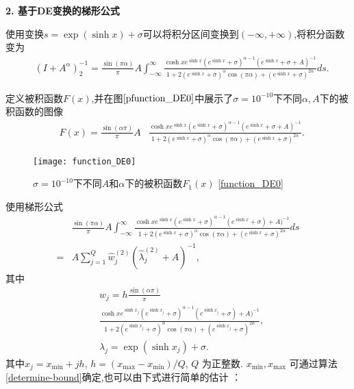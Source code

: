 \textbf{2. 基于DE变换的梯形公式}


使用变换\(s=\exp(\sinh x)+\sigma\)可以将积分区间变换到\((-\infty,+\infty)\),将积分函数变为
\begin{equation}
	\begin{aligned}
		&(I+A^{\alpha})^{-1}_2=
		\frac{\sin(\pi\alpha)}{\pi}A\int_{-\infty}^{\infty}
		\frac{ \cosh xe^{\sinh x}(e^{\sinh x}+\sigma)^{\alpha-1}(e^{\sinh x}+\sigma+{A})^{-1}}{1+2(e^{\sinh x}+\sigma)^{\alpha}\cos(\pi\alpha)+(e^{\sinh x}+\sigma)^{2\alpha}} ds.
	\end{aligned}
\end{equation}

定义被积函数\(F(x)\),并在图$\ref{pfunction_DE0}$中展示了\(\sigma=10^{-10}\)下不同\(\alpha,A\)下的被积函数的图像
\begin{equation}\label{function_DE0}
	\begin{aligned}
		&F(x)=\frac{\sin(\alpha\pi)}{\pi}A
		&\frac{ \cosh xe^{\sinh x}(e^{\sinh x}+\sigma)^{\alpha-1}(e^{\sinh x}+\sigma+{A})^{-1}}{1+2(e^{\sinh x}+\sigma)^{\alpha}\cos(\pi\alpha)+(e^{\sinh x}+\sigma)^{2\alpha}}.
	\end{aligned}
\end{equation}

\begin{figure}[htbp]
	\centering
	\texttt{[image: function\_DE0]}
	\caption{\(\sigma=10^{-10}\)下不同$A$和$\alpha$下的被积函数$F_1(x)$ \eqref{function_DE0}}
	\label{pfunction_DE0}
\end{figure}

使用梯形公式
\begin{equation}
	\begin{aligned}
		&\frac{\sin(\pi\alpha)}{\pi}A\int_{-\infty}^{\infty}
		\frac{ \cosh xe^{\sinh x}(e^{\sinh x}+\sigma)^{\alpha-1}(e^{\sinh x}+\sigma)+{A})^{-1}}{1+2(e^{\sinh x}+\sigma)^{\alpha}\cos(\pi\alpha)+(e^{\sinh x}+\sigma)^{2\alpha}} ds\\
		= & A\sum_{j=1}^Q \hat{w}^{(2)}_j(\hat{\lambda}^{(2)}_j+A)^{-1},
	\end{aligned}
\end{equation}
其中
\begin{equation}
	\begin{aligned}
		& w_j=h\frac{\sin(\alpha\pi)}{\pi}\\
		&\frac{ \cosh xe^{\sinh x_j}(e^{\sinh x_j}+\sigma)^{\alpha-1}(e^{\sinh x_j}+\sigma)+{A})^{-1}}{1+2(e^{\sinh x_j}+\sigma)^{\alpha}\cos(\pi\alpha)+(e^{\sinh x_j}+\sigma)^{2\alpha}} ,\\
		& \lambda_j=\exp(\sinh x_j)+\sigma.
	\end{aligned}
	\label{lw_DE0_q}
\end{equation}
其中$x_j=x_{\min}+jh$, $h=(x_{\max}-x_{\min})/Q$, $Q$ 为正整数. $x_{\min}, x_{\max}$ 可通过算法\ref{determine-bound}确定,也可以由下式进行简单的估计 ：


